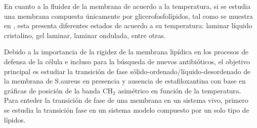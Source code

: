 \documentclass[%
 reprint,
 amsmath,amssymb,
 aps,
]{revtex4-2}
\begin{document}
En cuanto a la fluidez de la membrana de acuerdo a la temperatura, si se estudia una membrana compuesta \'{u}nicamente por glicerofosfol\'{i}pidos, tal como se muestra en \cite{Heimburg}, esta presenta diferentes estados de acuerdo a su temperatura:  laminar l\'{i}quido cristalino, gel laminar, laminar ondulada, entre otras.

Debido a la importancia de la rigidez de la membrana lip\'{i}dica en los procesos de defensa de la c\'{e}lula e incluso para la b\'{u}squeda de nuevos antibi\'{o}ticos, el objetivo principal es estudiar la transici\'{o}n de fase s\'{o}lido-ordenado/l\'{i}quido-desordenado de la membrana de S.aureus en presencia y ausencia de estafiloxantina con base en gr\'{a}ficas de posici\'{o}n de la banda CH$_{2}$ asim\'{e}trico en funci\'{o}n de la temperatura.\\
Para enteder la transici\'{o}n de fase de una membrana en un sistema vivo, primero se estudia la transici\'{o}n fase en un sistema modelo compuesto por un solo tipo de l\'{i}pidos.
\end{document}
